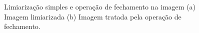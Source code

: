\begin{figure}[H]
\centering
    \caption{\label{fig:thresh_close} Limiarização simples e operação de fechamento na imagem (a) Imagem limiarizada (b) Imagem tratada pela operação de fechamento.}

\end{figure}

